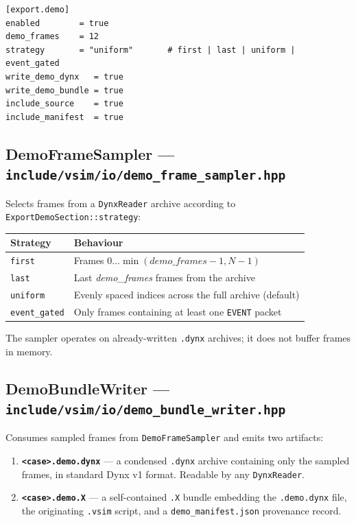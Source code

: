 ﻿\documentclass[11pt,a4paper]{article}
\begin{document}
\begin{lstlisting}
[export.demo]
enabled        = true
demo_frames    = 12
strategy       = "uniform"       # first | last | uniform | event_gated
write_demo_dynx   = true
write_demo_bundle = true
include_source    = true
include_manifest  = true
\end{lstlisting}

\subsection*{DemoFrameSampler --- \texttt{include/vsim/io/demo\_frame\_sampler.hpp}}

Selects frames from a \texttt{DynxReader} archive according to \texttt{ExportDemoSection::strategy}:

\begin{center}
\begin{tabularx}{\linewidth}{@{}lX@{}}
\toprule
\textbf{Strategy} & \textbf{Behaviour} \\
\midrule
\texttt{first}       & Frames $0 \ldots \min(\textit{demo\_frames}-1, N-1)$ \\
\texttt{last}        & Last \textit{demo\_frames} frames from the archive \\
\texttt{uniform}     & Evenly spaced indices across the full archive (default) \\
\texttt{event\_gated} & Only frames containing at least one \texttt{EVENT} packet \\
\bottomrule
\end{tabularx}
\end{center}

The sampler operates on already-written \texttt{.dynx} archives; it does not buffer frames in memory.

\subsection*{DemoBundleWriter --- \texttt{include/vsim/io/demo\_bundle\_writer.hpp}}

Consumes sampled frames from \texttt{DemoFrameSampler} and emits two artifacts:

\begin{enumerate}[leftmargin=*,itemsep=2pt]
  \item \textbf{\texttt{<case>.demo.dynx}} --- a condensed \texttt{.dynx} archive containing only the sampled frames, in standard Dynx v1 format.  Readable by any \texttt{DynxReader}.
  \item \textbf{\texttt{<case>.demo.X}} --- a self-contained \texttt{.X} bundle embedding the \texttt{.demo.dynx} file, the originating \texttt{.vsim} script, and a \texttt{demo\_manifest.json} provenance record.
\end{enumerate}
\end{document}
